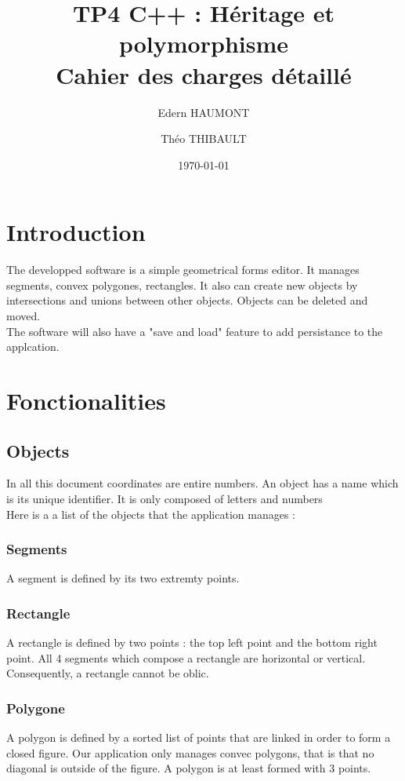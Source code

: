 \documentclass[a4paper, 12pts]{article}
\title{%
 TP4 C++ : Héritage et polymorphisme \\
 \large Cahier des charges détaillé}
\author{Edern HAUMONT}
\author{Théo THIBAULT}
\affil{B3133}
\date{\today}
\begin{document}

\maketitle



\section{Introduction}
	The developped software is a simple geometrical forms editor. It manages segments, convex polygones, rectangles. It also can create new objects by intersections and unions between other objects.
	Objects can be deleted and moved.\\
	The software will also have a "save and load" feature to add persistance to the applcation.

\section{Fonctionalities}
	\subsection{Objects}
		In all this document coordinates are entire numbers.
		An object has a name which is its unique identifier. It is only composed of letters and numbers\\
		Here is a a list of the objects that the application manages :
		\subsubsection{Segments}
			A segment is defined by its two extremty points.
		\subsubsection{Rectangle}
			A rectangle is defined by two points : the top left point and the bottom right point.
			All 4 segments which compose a rectangle are horizontal or vertical. Consequently, a rectangle cannot be oblic.
		\subsubsection{Polygone}
			A polygon is defined by a sorted list of points that are linked in order to form a closed figure.
			Our application only manages convec polygons,  that is that no diagonal is outside of the figure.
			A polygon is at least formed with 3 points.
\end{document}
